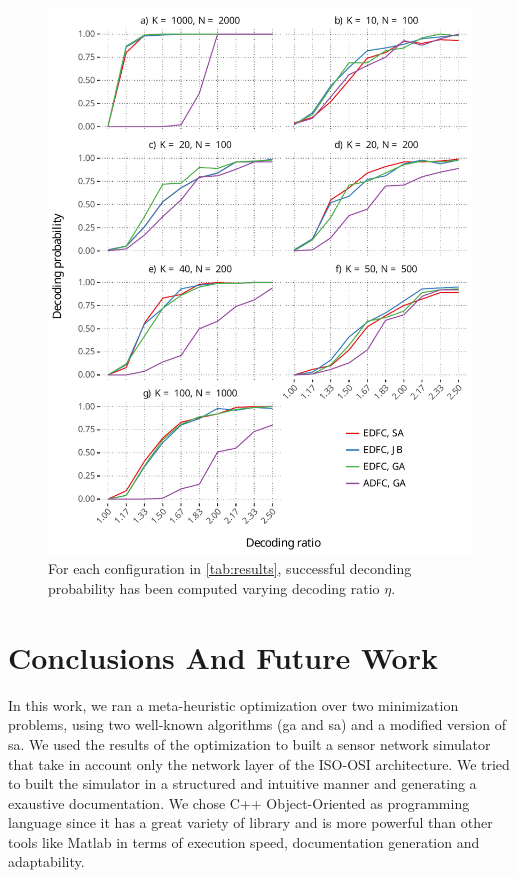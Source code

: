 \documentclass[12pt,journal,draftclsnofoot,onecolumn]{IEEEtran}
\begin{document}
\begin{figure}[htp]
	\label{fig:eta_vs_prob_reliable_ones}
	\includegraphics[]{figures/eta_vs_prob_reliable_ones.pdf}
	\caption{For each configuration in \autoref{tab:results}, successful deconding probability has been computed varying decoding ratio $\eta$.}
\end{figure}

\glsresetall
\section{Conclusions And Future Work}\label{sec:conclusions}
In this work, we ran a meta-heuristic optimization over two minimization problems, using two well-known algorithms (\gls{ga} and \gls{sa}) and a modified version of \gls{sa}.
We used the results of the optimization to built a sensor network simulator that take in account only the network layer of the ISO-OSI architecture.
We tried to built the simulator in a structured and intuitive manner and generating a exaustive documentation.
We chose C++ Object-Oriented as programming language since it has a great variety of library and is more powerful than other tools like Matlab in terms of execution speed, documentation generation and adaptability.



\end{document}
